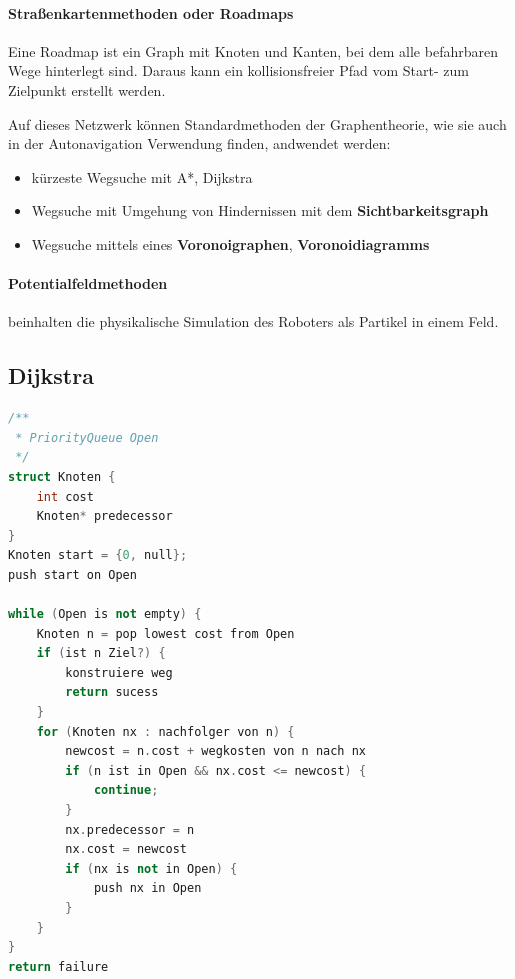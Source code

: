 \paragraph{Straßenkartenmethoden oder Roadmaps}
Eine Roadmap ist ein Graph mit Knoten und Kanten, bei dem alle befahrbaren
Wege hinterlegt sind. Daraus kann ein kollisionsfreier Pfad vom Start- zum
Zielpunkt erstellt werden.

Auf dieses Netzwerk können Standardmethoden der Graphentheorie, wie sie auch in
der Autonavigation Verwendung finden, andwendet werden:
\begin{itemize}
	\item kürzeste Wegsuche mit A*, Dijkstra
	\item Wegsuche mit Umgehung von Hindernissen mit dem
		\textbf{Sichtbarkeitsgraph}
	\item Wegsuche mittels eines \textbf{Voronoigraphen},
		\textbf{Voronoidiagramms}
\end{itemize}

\paragraph{Potentialfeldmethoden} beinhalten die physikalische Simulation des
Roboters als Partikel in einem Feld.

\subsection{Dijkstra}
\begin{lstlisting}[language=c++]
/**
 * PriorityQueue Open
 */
struct Knoten {
	int cost
	Knoten* predecessor
}
Knoten start = {0, null};
push start on Open

while (Open is not empty) {
	Knoten n = pop lowest cost from Open
	if (ist n Ziel?) {
		konstruiere weg
		return sucess
	}
	for (Knoten nx : nachfolger von n) {
		newcost = n.cost + wegkosten von n nach nx
		if (n ist in Open && nx.cost <= newcost) {
			continue;
		}
		nx.predecessor = n
		nx.cost = newcost
		if (nx is not in Open) {
			push nx in Open
		}
	}
}
return failure
\end{lstlisting}

